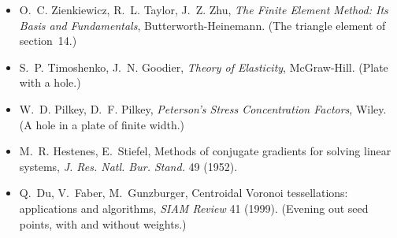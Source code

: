 \documentclass[11pt,a4paper]{article}
\begin{document}
\begin{itemize}
  \item O.~C. Zienkiewicz, R.~L. Taylor, J.~Z. Zhu, \emph{The Finite Element Method: Its Basis and
        Fundamentals}, Butterworth-Heinemann. (The triangle element of section~14.)
  \item S.~P. Timoshenko, J.~N. Goodier, \emph{Theory of Elasticity}, McGraw-Hill. (Plate with a hole.)
  \item W.~D. Pilkey, D.~F. Pilkey, \emph{Peterson's Stress Concentration Factors}, Wiley.
        (A hole in a plate of finite width.)
  \item M.~R. Hestenes, E.~Stiefel, Methods of conjugate gradients for solving linear systems,
        \emph{J. Res. Natl. Bur. Stand.} 49 (1952).
  \item Q.~Du, V.~Faber, M.~Gunzburger, Centroidal Voronoi tessellations: applications and algorithms,
        \emph{SIAM Review} 41 (1999). (Evening out seed points, with and without weights.)
\end{itemize}
\end{document}
